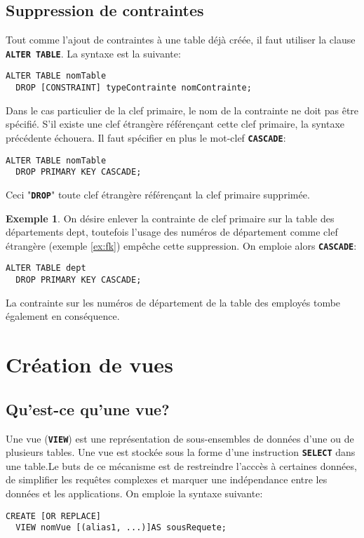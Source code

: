 \documentclass[a4paper, 12pt]{report}
\newcommand{\textSQL}[1]{\texttt{\textbf{#1}}}
\theoremstyle{definition} \newtheorem{ex}{Exemple}
\begin{document}
\section{Suppression de contraintes}
Tout comme l'ajout de contraintes à une table déjà créée, il faut utiliser la clause \textSQL{ALTER TABLE}. La syntaxe est la suivante:
\begin{lstlisting}[frame=single]
ALTER TABLE nomTable
  DROP [CONSTRAINT] typeContrainte nomContrainte;
\end{lstlisting}

Dans le cas particulier de la clef primaire, le nom de la contrainte ne doit pas être spécifié. S'il existe une clef étrangère référençant cette clef primaire, la syntaxe précédente échouera. Il faut spécifier en plus le mot-clef \textSQL{CASCADE}:
\begin{lstlisting}[frame=single]
ALTER TABLE nomTable
  DROP PRIMARY KEY CASCADE;
\end{lstlisting}
Ceci "\textSQL{DROP}" toute clef étrangère référençant la clef primaire supprimée. 

\begin{ex}
On désire enlever la contrainte de clef primaire sur la table des départements dept, toutefois l'usage des numéros de département comme clef étrangère (exemple \ref{ex:fk})  empêche cette suppression. On emploie alors \textSQL{CASCADE}:
\begin{lstlisting}[frame=single]
ALTER TABLE dept
  DROP PRIMARY KEY CASCADE;
\end{lstlisting}

La contrainte sur les numéros de département de la table des employés tombe également en conséquence.
\end{ex}

\chapter{Création de vues}
\section[Introduction]{Qu'est-ce qu'une vue?}
Une vue (\textSQL{VIEW}) est une représentation de sous-ensembles de données d'une ou de plusieurs tables. Une vue est stockée sous la forme d'une instruction \textSQL{SELECT} dans une table.Le buts de ce mécanisme est de restreindre l'acccès à certaines données, de simplifier les requêtes complexes et marquer une indépendance entre les données et les applications. On emploie la syntaxe suivante:
\begin{lstlisting}[frame=single]
CREATE [OR REPLACE]
  VIEW nomVue [(alias1, ...)]AS sousRequete;
\end{lstlisting}
\end{document}

